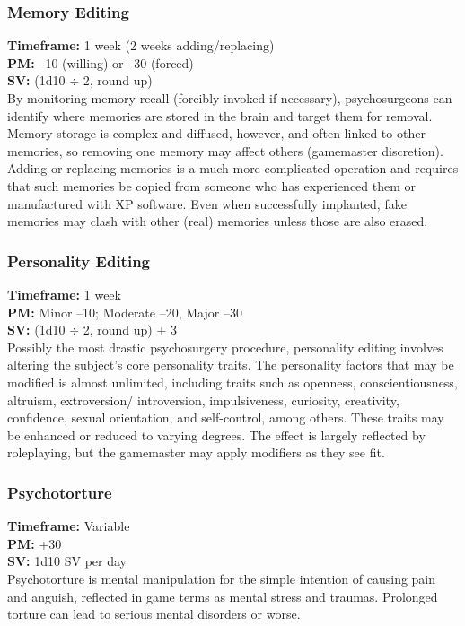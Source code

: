 \subsubsection{Memory Editing}
\textbf{Timeframe:} 1 week (2 weeks adding/replacing) \\
\textbf{PM:} –10 (willing) or –30 (forced) \\
\textbf{SV:} (1d10 $\div$ 2, round up) \\
By monitoring memory recall (forcibly invoked if necessary),
psychosurgeons can identify where memories
are stored in the brain and target them for removal.
Memory storage is complex and diffused, however,
and often linked to other memories, so removing one
memory may affect others (gamemaster discretion).
Adding or replacing memories is a much more complicated
operation and requires that such memories be
copied from someone who has experienced them or
manufactured with XP software. Even when successfully
implanted, fake memories may clash with other
(real) memories unless those are also erased.

\subsubsection{Personality Editing}
\textbf{Timeframe:} 1 week \\
\textbf{PM:} Minor –10; Moderate –20, Major –30 \\
\textbf{SV:} (1d10 $\div$ 2, round up) + 3 \\
Possibly the most drastic psychosurgery procedure,
personality editing involves altering the subject’s core
personality traits. The personality factors that may be
modified is almost unlimited, including traits such as
openness, conscientiousness, altruism, extroversion/
introversion, impulsiveness, curiosity, creativity, confidence, sexual orientation, and self-control, among
others. These traits may be enhanced or reduced to
varying degrees. The effect is largely reflected by roleplaying,
but the gamemaster may apply modifiers as
they see fit.

\subsubsection{Psychotorture}
\textbf{Timeframe:} Variable \\
\textbf{PM:} +30 \\
\textbf{SV:} 1d10 SV per day \\
Psychotorture is mental manipulation for the simple
intention of causing pain and anguish, reflected in
game terms as mental stress and traumas. Prolonged
torture can lead to serious mental disorders or worse.

